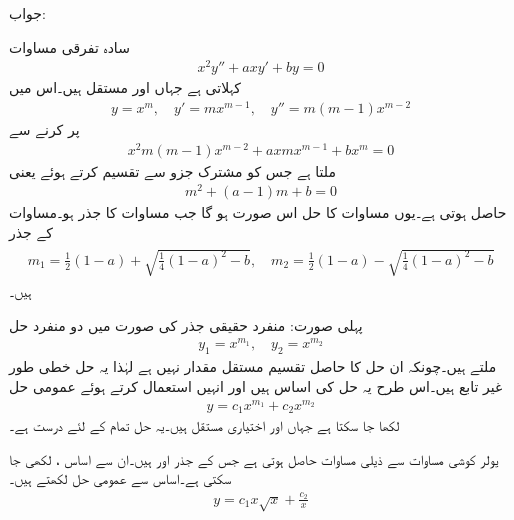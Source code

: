 جواب:

سادہ تفرقی مساوات 
\begin{align}\label{مساوات_سادہ_دو_درجی_یولر_کوشی_الف}
x^2y''+axy'+by=0
\end{align}
 کہلاتی ہے جہاں  اور  مستقل ہیں۔اس میں
\begin{align*}
y=x^m, \quad y'=mx^{m-1}, \quad y''=m(m-1)x^{m-2}
\end{align*}
پر کرنے سے
\begin{align*}
x^2m(m-1)x^{m-2}+axmx^{m-1}+bx^m=0
\end{align*}
ملتا ہے جس کو مشترک جزو  سے تقسیم کرتے ہوئے   یعنی
\begin{align}\label{مساوات_سادہ_دو_درجی_یولر_کوشی_ب}
m^2+(a-1)m+b=0
\end{align}
حاصل ہوتی ہے۔یوں  مساوات  کا حل اس صورت ہو گا جب  مساوات  کا جذر ہو۔مساوات  کے جذر
\begin{gather}
\begin{aligned}\label{مساوات_سادہ_دو_درجی_یولر_کوشی_پ}
m_1=\frac{1}{2}(1-a)+\sqrt{\frac{1}{4}(1-a)^2-b}, \quad m_2=\frac{1}{2}(1-a)-\sqrt{\frac{1}{4}(1-a)^2-b}
\end{aligned}
\end{gather}
ہیں۔

پہلی صورت: منفرد حقیقی جذر کی صورت میں دو منفرد حل 
\begin{align*}
y_1=x^{m_1},\quad y_2=x^{m_2}
\end{align*}
ملتے ہیں۔چونکہ ان حل کا حاصل تقسیم مستقل مقدار نہیں ہے لہٰذا یہ حل خطی طور غیر تابع ہیں۔اس طرح یہ حل کی اساس ہیں اور انہیں استعمال کرتے ہوئے عمومی حل
\begin{align}
y=c_1x^{m_1}+c_2x^{m_2}
\end{align}
لکھا جا سکتا ہے جہاں  اور  اختیاری مستقل ہیں۔یہ حل تمام  کے لئے درست ہے۔

یولر کوشی مساوات  سے  ذیلی مساوات حاصل ہوتی ہے جس کے جذر  اور  ہیں۔ان سے اساس ،  لکھی جا سکتی ہے۔اساس سے عمومی حل لکھتے ہیں۔
\begin{align*}
y=c_1x\sqrt{x}+\frac{c_2}{x}
\end{align*}

